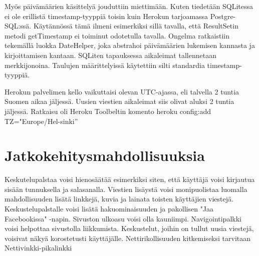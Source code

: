 \documentclass[titlepage]{article}
\begin{document}
Myös päivämäärien käsittelyä jouduttiin miettimään. Kuten tiedetään SQLitessa ei ole erillistä timestamp-tyyppiä toisin kuin Herokun tarjoamassa Postgre-SQL:ssä. Käytännössä tämä ilmeni esimerkiksi sillä tavalla, että ResultSetin metodi getTimestamp ei toiminut odotetulla tavalla. Ongelma ratkaistiin tekemällä luokka DateHelper, joka abstrahoi päivämäärien lukemisen kannasta ja kirjoittamisen kantaan. SQLiten tapauksessa aikaleimat tallennetaan merkkijonoina. Taulujen määrittelyissä käytettiin silti standardia timestamp-tyyppiä.

Herokun palvelimen kello vaikuttaisi olevan UTC-ajassa, eli talvella 2 tuntia Suomen aikaa jäljessä. Uusien viestien aikaleimat siis olivat aluksi 2 tuntia jäljessä. Ratkaisu oli Heroku Toolbeltin komento heroku config:add TZ="Europe/Hel-sinki”


\section*{Jatkokehitysmahdollisuuksia}

Keskutelupalstaa voisi hienosäätää esimerkiksi siten, että käyttäjä voisi kirjautua sisään tunnuksella ja salasanalla. Viestien lisäystä voisi monipuolistaa luomalla mahdollisuuden lisätä linkkejä, kuvia ja lainata toisten käyttäjien viestejä. Keskustelupalstalle voisi lisätä hakuominaisuuden ja pakollisen "Jaa Facebookissa" -napin. Sivuston ulkoasu voisi olla kauniimpi. Navigointipalkki voisi helpottaa sivustolla liikkumista. Keskustelut, joihin on tullut uusia viestejä, voisivat näkyä korostetusti käyttäjälle. Nettirikollisuuden kitkemiseksi tarvitaan Nettivinkki-pikalinkki 
\end{document}
